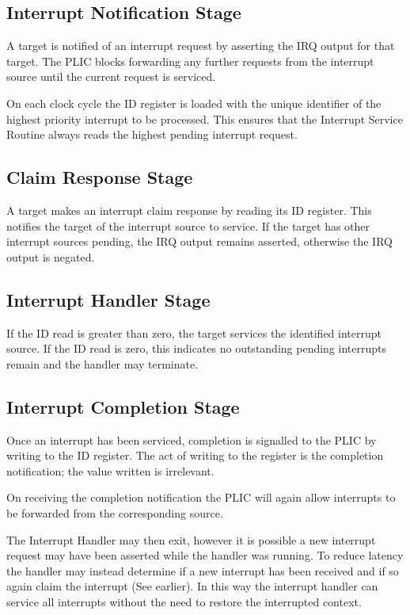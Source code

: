 \subsection{Interrupt Notification Stage}

A target is notified of an interrupt request by asserting the IRQ output for that target.
The PLIC blocks forwarding any further requests from the interrupt source until the current request is serviced.

On each clock cycle the ID register is loaded with the unique identifier of the highest priority interrupt to be processed.
This ensures that the Interrupt Service Routine always reads the highest pending interrupt request.

\subsection{Claim Response Stage} \label{sec:claim-response}

A target makes an interrupt claim response by reading its ID register.
This notifies the target of the interrupt source to service.
If the target has other interrupt sources pending, the IRQ output remains asserted, otherwise the IRQ output is negated.

\subsection{Interrupt Handler Stage}

If the ID read is greater than zero, the target services the identified interrupt source.
If the ID read is zero, this indicates no outstanding pending interrupts remain and the handler may terminate.

\subsection{Interrupt Completion Stage}

Once an interrupt has been serviced, completion is signalled to the PLIC by writing to the ID register.
The act of writing to the register is the completion notification; the value written is irrelevant.

On receiving the completion notification the PLIC will again allow interrupts to be forwarded from the corresponding source.

The Interrupt Handler may then exit, however it is possible a new
interrupt request may have been asserted while the handler was running.
To reduce latency the handler may instead determine if a new interrupt
has been received and if so again claim the interrupt (See earlier). In this
way the interrupt handler can service all interrupts without the need to
restore the interrupted context.


